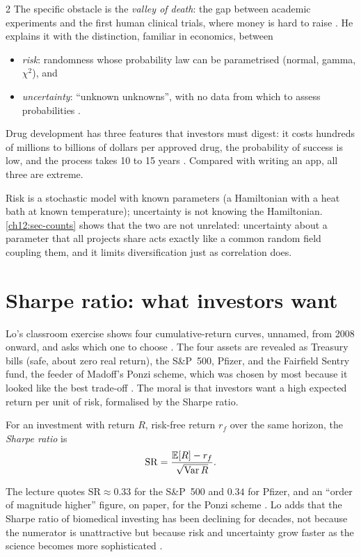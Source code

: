 \begin{paracol}{2}
The specific obstacle is the \emph{valley of death}: the gap between academic experiments and the first
human clinical trials, where money is hard to raise . He explains it with the distinction, familiar in economics, between
\begin{itemize}
  \item \emph{risk}: randomness whose probability law can be parametrised (normal, gamma, $\chi^2$), and
  \item \emph{uncertainty}: ``unknown unknowns'', with no data from which to assess probabilities
        .
\end{itemize}
Drug development has three features that investors must digest: it costs hundreds of millions to billions
of dollars per approved drug, the probability of success is low, and the process takes 10 to 15 years
. Compared with writing an app, all three are extreme.

\begin{intuition}
Risk is a stochastic model with known parameters (a Hamiltonian with a heat bath at known temperature);
uncertainty is not knowing the Hamiltonian. \cref{ch12:sec-counts} shows that the two are not unrelated:
uncertainty about a parameter that all projects share acts exactly like a common random field coupling them,
and it limits diversification just as correlation does.
\end{intuition}

\section{Sharpe ratio: what investors want}\label{ch12:sec-sharpe}

Lo's classroom exercise shows four cumulative-return curves, unnamed, from 2008 onward, and asks which one
to choose . The four assets are revealed as Treasury bills
(safe, about zero real return), the S\&P~500, Pfizer, and the Fairfield Sentry fund, the feeder of Madoff's
Ponzi scheme, which was chosen by most because it looked like the best trade-off . The moral
is that investors want a high expected return per unit of risk, formalised by the Sharpe ratio.

\begin{definition}\label{ch12:def-sharpe}
For an investment with return $R$, risk-free return $r_f$ over the same horizon, the \emph{Sharpe ratio} is
\[
  \mathrm{SR}=\frac{\mathbb{E}[R]-r_f}{\sqrt{\operatorname{Var} R}}.
\]
\end{definition}
The lecture quotes $\mathrm{SR}\approx0.33$ for the S\&P~500 and $0.34$ for Pfizer, and an ``order of magnitude
higher'' figure, on paper, for the Ponzi scheme . Lo adds that the Sharpe ratio of
biomedical investing has been declining for decades, not because the numerator is unattractive but
because risk and uncertainty grow faster as the science becomes more sophisticated .


\end{paracol}
